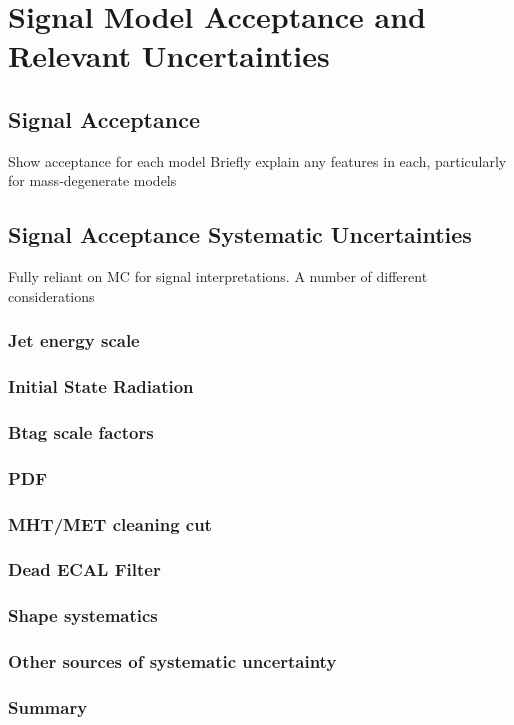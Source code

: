 \chapter{Signal Model Acceptance and Relevant Uncertainties}

\ifpdf
    \graphicspath{{Chapter7/Figs/Raster/}{Chapter7/Figs/PDF/}{Chapter7/Figs/}}
\else
    \graphicspath{{Chapter7/Figs/Vector/}{Chapter7/Figs/}}
\fi


\section{Signal Acceptance}  %
\label{sec:signal_acceptance}
Show acceptance for each model
Briefly explain any features in each, particularly for mass-degenerate models

\section{Signal Acceptance Systematic Uncertainties}  %
\label{sec:signal_uncertainties}

Fully reliant on MC for signal interpretations.
A number of different considerations

\subsection{Jet energy scale}
\subsection{Initial State Radiation}
\subsection{Btag scale factors}
\subsection{PDF}
\subsection{MHT/MET cleaning cut}
\subsection{Dead ECAL Filter}
\subsection{Shape systematics}
\subsection{Other sources of systematic uncertainty}
\subsection{Summary}